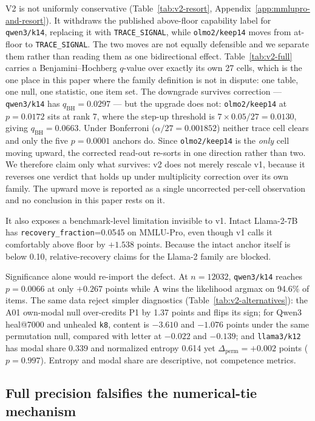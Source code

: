V2 is not uniformly conservative (Table~\ref{tab:v2-resort}, Appendix~\ref{app:mmlupro-and-resort}). It withdraws the published above-floor capability label for \texttt{qwen3/k14}, replacing it with \texttt{TRACE\_SIGNAL}, while \texttt{olmo2/keep14} moves from at-floor to \texttt{TRACE\_SIGNAL}. The two moves are not equally defensible and we separate them rather than reading them as one bidirectional effect. Table~\ref{tab:v2-full} carries a Benjamini--Hochberg $q$-value over exactly its own 27 cells, which is the one place in this paper where the family definition is not in dispute: one table, one null, one statistic, one item set. The downgrade survives correction --- \texttt{qwen3/k14} has $q_{\mathrm{BH}}=0.0297$ --- but the upgrade does not: \texttt{olmo2/keep14} at $p=0.0172$ sits at rank 7, where the step-up threshold is $7\times0.05/27=0.0130$, giving $q_{\mathrm{BH}}=0.0663$. Under Bonferroni ($\alpha/27=0.001852$) neither trace cell clears and only the five $p=0.0001$ anchors do. Since \texttt{olmo2/keep14} is the \emph{only} cell moving upward, the corrected read-out re-sorts in one direction rather than two. We therefore claim only what survives: v2 does not merely rescale v1, because it reverses one verdict that holds up under multiplicity correction over its own family. The upward move is reported as a single uncorrected per-cell observation and no conclusion in this paper rests on it.

It also exposes a benchmark-level limitation invisible to v1. Intact Llama-2-7B has \texttt{recovery\_fraction}=0.0545 on MMLU-Pro, even though v1 calls it comfortably above floor by $+1.538$ points. Because the intact anchor itself is below 0.10, relative-recovery claims for the Llama-2 family are blocked.

Significance alone would re-import the defect. At $n=12032$, \texttt{qwen3/k14} reaches $p=0.0066$ at only $+0.267$ points while A wins the likelihood argmax on 94.6\% of items. The same data reject simpler diagnostics
(Table~\ref{tab:v2-alternatives}):
the A01 own-modal null over-credits P1 by 1.37 points and flips its sign; for Qwen3 heal@7000 and unhealed \texttt{k8}, content is $-3.610$ and $-1.076$ points under the same permutation null, compared with letter at $-0.022$ and $-0.139$; and \texttt{llama3/k12} has modal share 0.339 and normalized entropy 0.614 yet $\Delta_{\mathrm{perm}}=+0.002$ points ($p=0.997$). Entropy and modal share are descriptive, not competence metrics.

\subsection{Full precision falsifies the numerical-tie mechanism}

